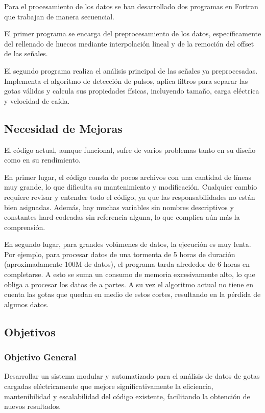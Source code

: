 \documentclass[12pt,a4paper]{article}
\begin{document}
Para el procesamiento de los datos se han desarrollado dos programas en Fortran que trabajan de manera secuencial.

El primer programa se encarga del preprocesamiento de los datos, específicamente del rellenado de huecos mediante interpolación lineal y de la remoción del offset de las señales.

El segundo programa realiza el análisis principal de las señales ya preprocesadas. Implementa el algoritmo de detección de pulsos, aplica filtros para separar las gotas válidas y calcula sus propiedades físicas, incluyendo tamaño, carga eléctrica y velocidad de caída.

\subsection{Necesidad de Mejoras}
\lhead{}

El código actual, aunque funcional, sufre de varios problemas tanto en su diseño como en su rendimiento.

En primer lugar, el código consta de pocos archivos con una cantidad de líneas muy grande, lo que dificulta su mantenimiento y modificación. Cualquier cambio requiere revisar y entender todo el código, ya que las responsabilidades no están bien asignadas. Además, hay muchas variables sin nombres descriptivos y constantes hard-codeadas sin referencia alguna, lo que complica aún más la comprensión.

En segundo lugar, para grandes volúmenes de datos, la ejecución es muy lenta. Por ejemplo, para procesar datos de una tormenta de 5 horas de duración (aproximadamente 100M de datos), el programa tarda alrededor de 6 horas en completarse. A esto se suma un consumo de memoria excesivamente alto, lo que obliga a procesar los datos de a partes. A su vez el algoritmo actual no tiene en cuenta las gotas que quedan en medio de estos cortes, resultando en la pérdida de algunos datos.

\subsection{Objetivos}
\lhead{}

\subsubsection{Objetivo General}

Desarrollar un sistema modular y automatizado para el análisis de datos de gotas cargadas eléctricamente que mejore significativamente la eficiencia, mantenibilidad y escalabilidad del código existente, facilitando la obtención de nuevos resultados.
\end{document}
